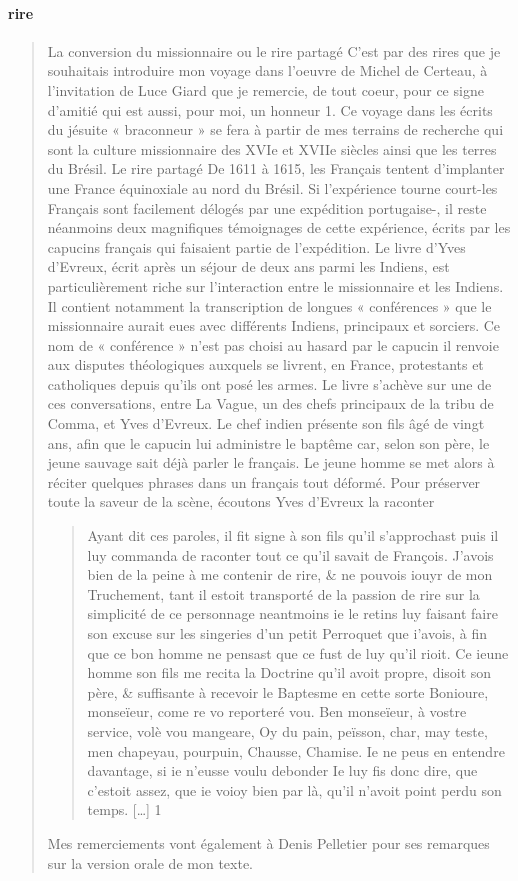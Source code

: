 \paragraph{rire}
\begin{quote}
    La conversion du missionnaire ou le rire partagé C'est par des rires que je souhaitais introduire mon voyage dans l'oeuvre de Michel de Certeau, à l'invitation de Luce Giard que je remercie, de tout coeur, pour ce signe d'amitié qui est aussi, pour moi, un honneur 1. Ce voyage dans les écrits du jésuite « braconneur » se fera à partir de mes terrains de recherche qui sont la culture missionnaire des XVIe et XVIIe siècles ainsi que les terres du Brésil. Le rire partagé De 1611 à 1615, les Français tentent d'implanter une France équinoxiale au nord du Brésil. Si l'expérience tourne court-les Français sont facilement délogés par une expédition portugaise-, il reste néanmoins deux magnifiques témoignages de cette expérience, écrits par les capucins français qui faisaient partie de l'expédition. Le livre d'Yves d'Evreux, écrit après un séjour de deux ans parmi les Indiens, est particulièrement riche sur l'interaction entre le missionnaire et les Indiens. Il contient notamment la transcription de longues « conférences » que le missionnaire aurait eues avec différents Indiens, principaux et sorciers. Ce nom de « conférence » n'est pas choisi au hasard par le capucin   il renvoie aux disputes théologiques auxquels se livrent, en France, protestants et catholiques depuis qu'ils ont posé les armes. Le livre s'achève sur une de ces conversations, entre La Vague, un des chefs principaux de la tribu de Comma, et Yves d'Evreux. Le chef indien présente son fils âgé de vingt ans, afin que le capucin lui administre le baptême car, selon son père, le jeune sauvage sait déjà parler le français. Le jeune homme se met alors à réciter quelques phrases dans un français tout déformé. Pour préserver toute la saveur de la scène, écoutons Yves d'Evreux la raconter   
    \begin{quote}
        Ayant dit ces paroles, il fit signe à son fils qu'il s'approchast   puis il luy commanda de raconter tout ce qu'il savait de François. J'avois bien de la peine à me contenir de rire, \& ne pouvois iouyr de mon Truchement, tant il estoit transporté de la passion de rire sur la simplicité de ce personnage   neantmoins ie le retins luy faisant faire son excuse sur les singeries d'un petit Perroquet que i'avois, à fin que ce bon homme ne pensast que ce fust de luy qu'il rioit. Ce ieune homme son fils me recita la Doctrine qu'il avoit propre, disoit son père, \& suffisante à recevoir le Baptesme en cette sorte   Bonioure, monseïeur, come re vo reporteré vou. Ben monseïeur, à vostre service, volè vou mangeare, Oy   du pain, peïsson, char, may teste, men chapeyau, pourpuin, Chausse, Chamise. Ie ne peus en entendre davantage, si ie n'eusse voulu debonder   Ie luy fis donc dire, que c'estoit assez, que ie voioy bien par là, qu'il n'avoit point perdu son temps. […] 1
    \end{quote}
     Mes remerciements vont également à Denis Pelletier pour ses remarques sur la version orale de mon texte.
\end{quote}


